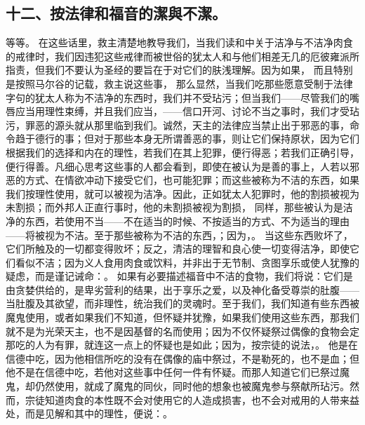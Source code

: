 
\subsection{十二、按法律和福音的潔與不潔。}

等等。 在这些话里，救主清楚地教导我们，当我们读和中关于洁净与不洁净肉食的戒律时，我们因违犯这些戒律而被世俗的犹太人和与他们相差无几的厄彼雍派所指责，但我们不要认为圣经的要旨在于对它们的肤浅理解。因为如果， 而且特别是按照马尔谷的记载，救主说这些事， 那么显然，当我们吃那些愿意受制于法律字句的犹太人称为不洁净的东西时，我们并不受玷污；但当我们——尽管我们的嘴唇应当用理性束缚，并且我们应当，——信口开河、讨论不当之事时，我们才受玷污，罪恶的源头就从那里临到我们。诚然，天主的法律应当禁止出于邪恶的事，命令趋于德行的事；但对于那些本身无所谓善恶的事，则让它们保持原状，因为它们根据我们的选择和内在的理性，若我们在其上犯罪，便行得恶；若我们正确引导，便行得善。凡细心思考这些事的人都会看到，即使在被认为是善的事上，人若以邪恶的方式、在情欲冲动下接受它们，也可能犯罪；而这些被称为不洁的东西，如果我们按理性使用，就可以被视为洁净。因此，正如犹太人犯罪时，他的割损被视为未割损；而外邦人正直行事时，他的未割损被视为割损， 同样，那些被认为是洁净的东西，若使用不当——不在适当的时候、不按适当的方式、不为适当的理由——将被视为不洁。至于那些被称为不洁的东西，；因为，。 当这些东西败坏了，它们所触及的一切都变得败坏；反之，清洁的理智和良心使一切变得洁净，即使它们看似不洁；因为义人食用肉食或饮料，并非出于无节制、贪图享乐或使人犹豫的疑虑，而是谨记诫命：。 如果有必要描述福音中不洁的食物，我们将说：它们是由贪婪供给的，是卑劣营利的结果，出于享乐之爱，以及神化备受尊崇的肚腹——当肚腹及其欲望，而非理性，统治我们的灵魂时。至于我们，我们知道有些东西被魔鬼使用，或者如果我们不知道，但怀疑并犹豫，如果我们使用这些东西，那我们就不是为光荣天主，也不是因基督的名而使用；因为不仅怀疑祭过偶像的食物会定那吃的人为有罪，就连这一点上的怀疑也是如此；因为，按宗徒的说法，。 他是在信德中吃，因为他相信所吃的没有在偶像的庙中祭过，不是勒死的，也不是血；但他不是在信德中吃，若他对这些事中任何一件有怀疑。而那人知道它们已祭过魔鬼，却仍然使用，就成了魔鬼的同伙，同时他的想象也被魔鬼参与祭献所玷污。然而，宗徒知道肉食的本性既不会对使用它的人造成损害，也不会对戒用的人带来益处，而是见解和其中的理性，便说：。 